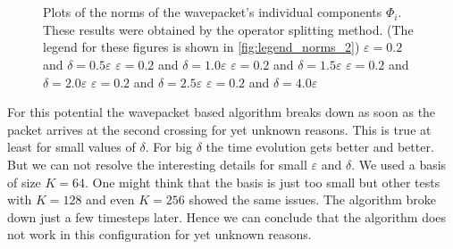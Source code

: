 \begin{figure}
{  } \\
   \\
  \caption[Plots of the norms of the wavepacket's individual components $\Phi_i$.]{
    Plots of the norms of the wavepacket's individual components $\Phi_i$. These
    results were obtained by the operator splitting method. (The legend for these figures
    is shown in \ref{fig:legend_norms_2})
     $\varepsilon = 0.2$ and $\delta = 0.5 \varepsilon$
     $\varepsilon = 0.2$ and $\delta = 1.0 \varepsilon$
     $\varepsilon = 0.2$ and $\delta = 1.5 \varepsilon$
     $\varepsilon = 0.2$ and $\delta = 2.0 \varepsilon$
     $\varepsilon = 0.2$ and $\delta = 2.5 \varepsilon$
     $\varepsilon = 0.2$ and $\delta = 4.0 \varepsilon$
    \label{fig:two_crossings_norms_f}
  }
\end{figure}

For this potential the wavepacket based algorithm breaks down as soon as the packet
arrives at the second crossing for yet unknown reasons. This is true at least for small values
of $\delta$. For big $\delta$ the time evolution gets better and better.
But we can not resolve the interesting details for small $\varepsilon$ and $\delta$.
We used a basis of size $K=64$. One might think that the basis is just too small
but other tests with $K = 128$ and even $K = 256$ showed the same issues. The algorithm
broke down just a few timesteps later. Hence we can conclude that the algorithm does
not work in this configuration for yet unknown reasons.

